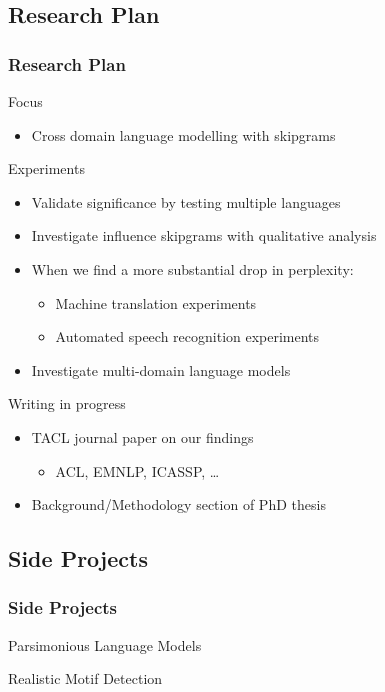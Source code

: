 \documentclass{beamer}
\begin{document}
\begin{frame}\section{Research Plan}
    \frametitle{Research Plan}

    \begin{block}{Focus}
        \begin{itemize}
            \item Cross domain language modelling with skipgrams
        \end{itemize}
    \end{block}

    \begin{block}{Experiments}
        \begin{itemize}
            \item Validate significance by testing multiple languages
            \item Investigate influence skipgrams with qualitative analysis
            \item When we find a more substantial drop in perplexity:
                \begin{itemize}
                    \item Machine translation experiments
                    \item Automated speech recognition experiments
                \end{itemize}
            \item Investigate multi-domain language models
        \end{itemize}
    \end{block}

    \begin{block}{Writing in progress}
        \begin{itemize}
            \item TACL journal paper on our findings
                \begin{itemize}
                    \item ACL, EMNLP, ICASSP, \ldots
                \end{itemize}
            \item Background/Methodology section of PhD thesis
        \end{itemize}
    \end{block}
\end{frame}

\begin{frame}\section{Side Projects}
    \frametitle{Side Projects}

    \begin{block}{Parsimonious Language Models}

    \end{block}

    \begin{block}{Realistic Motif Detection}

    \end{block}
\end{frame}
\end{document}
